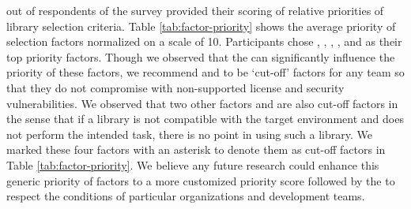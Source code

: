  out of  respondents of the survey provided their scoring of relative priorities of library selection criteria. Table \ref{tab:factor-priority} shows the average priority of selection factors normalized on a scale of 10. Participants chose , , , , and  as their top priority factors. Though we observed that the {\principle} can significantly influence the priority of these factors, we recommend  and  to be `cut-off' factors for any team so that they do not compromise with non-supported license and security vulnerabilities. We observed that two other factors  and  are also cut-off factors in the sense that if a library is not compatible with the target environment and does not perform the intended task, there is no point in using such a library. We marked these four factors with an asterisk to denote them as cut-off factors in Table \ref{tab:factor-priority}. We believe any future research could enhance this generic priority of factors to a more customized priority score followed by the {\principle} to respect the conditions of particular organizations and development teams.